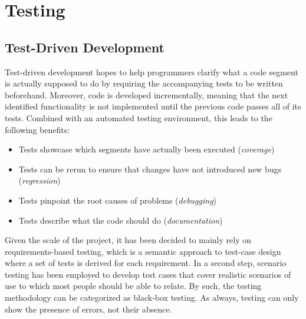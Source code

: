 
\chapter{Testing}
\label{chp:testing}

\section{Test-Driven Development}
\label{sec:TDD}
Test-driven development hopes to help programmers clarify what a code segment is actually supposed to do by requiring the accompanying tests to be written beforehand. Moreover, code is developed incrementally, meaning that the next identified functionality is not implemented until the previous code passes all of its tests. Combined with an automated testing environment, this leads to the following benefits:

\begin{itemize}
  \item Tests showcase which segments have actually been executed (\textit{coverage})
  \item Tests can be rerun to ensure that changes have not introduced new bugs (\textit{regression})
  \item Tests pinpoint the root causes of problems (\textit{debugging})
  \item Tests describe what the code should do (\textit{documentation})
\end{itemize}

Given the scale of the project, it has been decided to mainly rely on requirements-based testing, which is a semantic approach to test-case design where a set of tests is derived for each requirement. In a second step, scenario testing has been employed to develop test cases that cover realistic scenarios of use to which most people should be able to relate. By such, the testing methodology can be categorized as black-box testing. As always, testing can only show the presence of errors, not their absence. 


